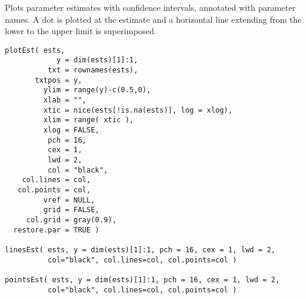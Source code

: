 \begin{Description}\relax
Plots parameter estimates with confidence intervals, annotated with
parameter names. A dot is plotted at the estimate and a horizontal
line extending from the lower to the upper limit is superimposed.
\end{Description}
\begin{Usage}
\begin{verbatim}
plotEst( ests,
            y = dim(ests)[1]:1,
          txt = rownames(ests),
       txtpos = y, 
         ylim = range(y)-c(0.5,0),
         xlab = "",
         xtic = nice(ests[!is.na(ests)], log = xlog),
         xlim = range( xtic ),
         xlog = FALSE,
          pch = 16,
          cex = 1,
          lwd = 2,
          col = "black",
    col.lines = col,
   col.points = col,
         vref = NULL,
         grid = FALSE,
     col.grid = gray(0.9),
  restore.par = TRUE ) 

linesEst( ests, y = dim(ests)[1]:1, pch = 16, cex = 1, lwd = 2,
          col="black", col.lines=col, col.points=col )

pointsEst( ests, y = dim(ests)[1]:1, pch = 16, cex = 1, lwd = 2,
          col="black", col.lines=col, col.points=col )
\end{verbatim}
\end{Usage}
